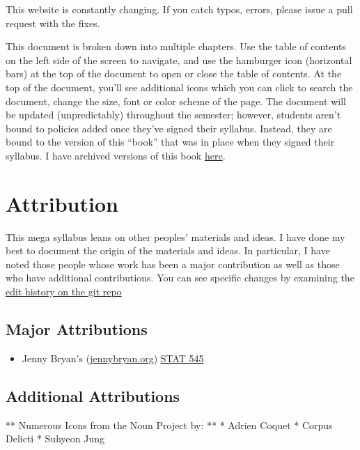 This website is constantly changing. If you catch typos, errors, please issue a pull request with the fixes.

This document is broken down into multiple chapters. Use the table of contents on the left side of the screen to navigate, and use the hamburger icon (horizontal bars) at the top of the document to open or close the table of contents. At the top of the document, you'll see additional icons which you can click to search the document, change the size, font or color scheme of the page. The document will be updated (unpredictably) throughout the semester; however, students aren't bound to policies added once they've signed their syllabus. Instead, they are bound to the version of this ``book'' that was in place when they signed their syllabus. I have archived versions of this book \href{https://github.com/smasongarrison/syllabi/tree/main/Previous\%20Semesters}{here}.

\hypertarget{attribution}{%
\chapter*{Attribution}\label{attribution}}


This mega syllabus leans on other peoples' materials and ideas. I have done my best to document the origin of the materials and ideas. In particular, I have noted those people whose work has been a major contribution as well as those who have additional contributions. You can see specific changes by examining the \href{https://github.com/smasongarrison/Syllabi/commits/main}{edit history on the git repo}

\hypertarget{major-attributions}{%
\section*{Major Attributions}\label{major-attributions}}


\begin{itemize}
\tightlist
\item
  Jenny Bryan's (\href{https://jennybryan.org}{jennybryan.org}) \href{https://stat545.com}{STAT 545}
\end{itemize}

\hypertarget{additional-attributions}{%
\section*{Additional Attributions}\label{additional-attributions}}


** Numerous Icons from the Noun Project by: **
* Adrien Coquet
* Corpus Delicti
* Suhyeon Jung

